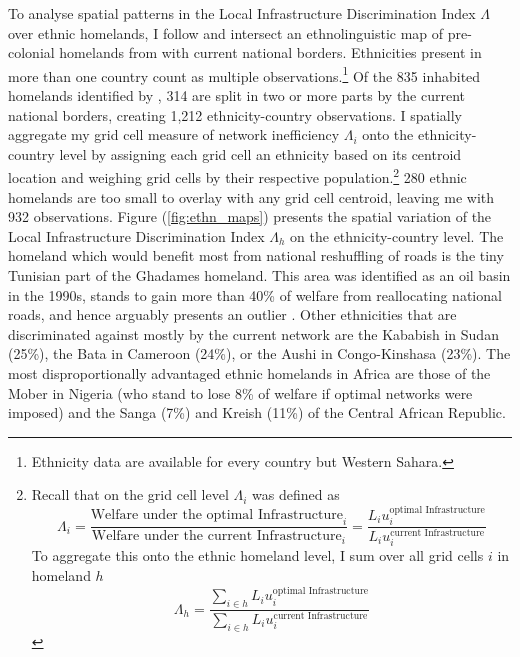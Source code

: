\documentclass[11pt, oneside]{article}   	%
\let\oldref\ref
\renewcommand{\ref}[1]{(\oldref{#1})}
\begin{document}
To analyse spatial patterns in the Local Infrastructure Discrimination Index $\Lambda$ over ethnic homelands, I follow \cite{Michalopoulos_PreColonialEthnicInstitutions_2013,Michalopoulos_NationalInstitutionsSubnational_2014,Michalopoulos_LongRunEffectsScramble_2016} and intersect an ethnolinguistic map of pre-colonial homelands from \cite{Murdock_Africaitspeoples_1959} with current national borders. Ethnicities present in more than one country count as multiple observations.\footnote{Ethnicity data are available for every country but Western Sahara.} Of the 835 inhabited homelands identified by \citeauthor{Murdock_Africaitspeoples_1959}, 314 are split in two or more parts by the current national borders, creating 1,212 ethnicity-country observations. I spatially aggregate my grid cell measure of network inefficiency $\Lambda_{i}$ onto the ethnicity-country level by assigning each grid cell an ethnicity based on its centroid location and weighing grid cells by their respective population.\footnote{Recall that on the grid cell level $\Lambda_{i}$ was defined as \begin{equation*}
  \Lambda_{i} = \frac{\textrm{Welfare under the optimal Infrastructure}_{i}}{\textrm{Welfare under the current Infrastructure}_{i}} = \frac{L_{i}u_{i}^{\textrm{optimal Infrastructure}}}{L_{i}u_{i}^{\textrm{current Infrastructure}}}
\end{equation*} To aggregate this onto the ethnic homeland level, I sum over all grid cells $i$ in homeland $h$ \begin{equation*}
  \Lambda_{h} = \frac{\sum_{i \in h}^{} L_{i}u_{i}^{\textrm{optimal Infrastructure}}}{\sum_{i \in h}^{}L_{i}u_{i}^{\textrm{current Infrastructure}}}
\end{equation*}} 280 ethnic homelands are too small to overlay with any grid cell centroid, leaving me with 932 observations. Figure \ref{fig:ethn_maps} presents the spatial variation of the Local Infrastructure Discrimination Index $\Lambda_{h}$ on the ethnicity-country level. The homeland which would benefit most from national reshuffling of roads is the tiny Tunisian part of the Ghadames homeland. This area was identified as an oil basin in the 1990s, stands to gain more than 40\% of welfare from reallocating national roads, and hence arguably presents an outlier \citep{Echikh_Geologyhydrocarbonoccurrences_1998}. Other ethnicities that are discriminated against mostly by the current network are the Kababish in Sudan (25\%), the Bata in Cameroon (24\%), or the Aushi in Congo-Kinshasa (23\%). The most disproportionally advantaged ethnic homelands in Africa are those of the Mober in Nigeria (who stand to lose 8\% of welfare if optimal networks were imposed) and the Sanga (7\%) and Kreish (11\%) of the Central African Republic.
\end{document}
